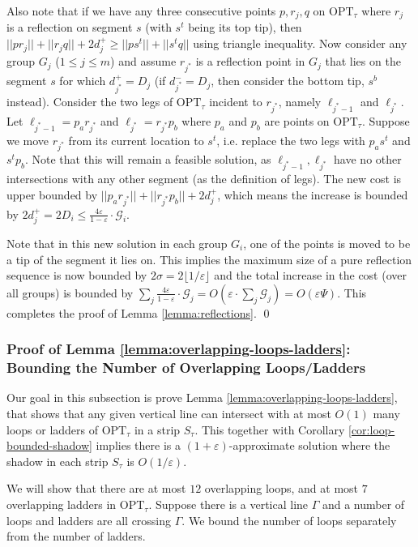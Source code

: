\documentclass[pdflatex,sn-mathphys-num]{sn-jnl}
\theoremstyle{thmstyleone}
\newcommand{\eps}{\varepsilon}
\newcommand{\OPT}{{\text{OPT}}}
\begin{document}
Also note that if we have any three consecutive points $p,r_j,q$ on $\OPT_\tau$ where $r_j$ is a reflection on segment $s$ (with $s^t$ being its top tip), then $||p r_j||+||r_j q||+ 2d^+_j\geq ||p s^t||+||s^t q||$ using triangle inequality. Now consider any group $G_j$ ($1\leq j\leq m$) and assume $r_{j^*}$
is a reflection point in $G_j$ that lies on the segment $s$ for which $d^+_{j^*}=D_j$ (if $d^-_{j^*} = D_j$, then consider the bottom tip, $s^b$ instead). Consider the two legs of $\OPT_\tau$ incident to $r_{j^*}$,  namely
$\ell_{j^*-1}$ and $\ell_{j^*}$. Let $\ell_{j^* - 1} = p_{a}r_{j^*}$ and $\ell_{j^*} = r_{j^*}p_{b}$ where $p_a$ and $p_b$ are points on $\OPT_\tau$. Suppose we move $r_{j^*}$ from its current location to $s^t$, i.e. replace the two legs with $p_as^t$ and $s^t p_b$. Note that this will remain a feasible solution, as $\ell_{j^*-1},\ell_{j^*}$ have no other intersections with any other segment (as the definition of legs). The new cost is upper bounded by $||p_a r_{j^*}||+||r_{j^*} p_b||+2d^+_j$,
which means the increase is bounded by $2d^+_j=2D_i \le \frac{4\eps}{1 - \eps}\cdot\mathcal G_i$.

Note that in this new solution in each group $G_i$, one of the points is moved to be a tip of the segment it lies on. This implies the maximum size of a pure reflection sequence is now bounded by $2\sigma = 2\lfloor 1/\eps \rfloor$ and the 
total increase in the cost (over all groups) is bounded by $\sum_{j}\frac{4\eps}{1-\eps}\cdot \mathcal G_j = O(\eps\cdot \sum_j\mathcal G_j)=O(\eps\Psi)$.
This completes the proof of Lemma \ref{lemma:reflections}. \qed

\subsubsection{Proof of Lemma \ref{lemma:overlapping-loops-ladders}: Bounding the Number of Overlapping Loops/Ladders}\label{sec:lemma-overlapping-loops/ladders}

Our goal in this subsection is prove Lemma \ref{lemma:overlapping-loops-ladders}, that shows that any given vertical line can intersect with at most $O(1)$ many loops or ladders of
$\OPT_\tau$ in a strip $S_\tau$. This together with Corollary \ref{cor:loop-bounded-shadow} implies there is a $(1+\eps)$-approximate solution where the shadow in each strip $S_\tau$ is $O(1/\eps)$.

We will show that there are at most $12$ overlapping loops, and at most $7$ overlapping ladders in $ \OPT_\tau $. 
    Suppose there is a vertical line $\Gamma$ and a number of loops and ladders are all crossing $\Gamma$.
    We bound the number of loops separately from the number of ladders.
    
\end{document}
